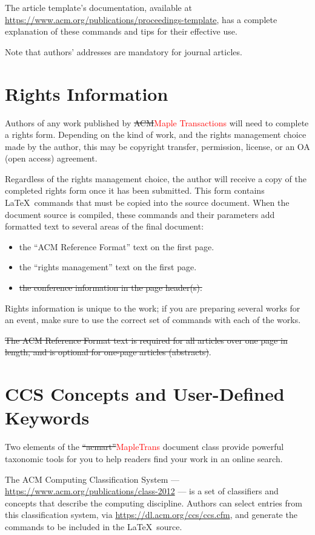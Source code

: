 \documentclass[anonymous,review,acmsmall,screen]{MapleTrans}
\newcommand{\strikethrough}[1]{\sout{#1}}
\begin{document}
The article template's documentation, available at
\url{https://www.acm.org/publications/proceedings-template}, has a
complete explanation of these commands and tips for their effective
use.

Note that authors' addresses are mandatory for journal articles.

\section{Rights Information}

Authors of any work published by \strikethrough{ACM}\textcolor{red}{Maple Transactions} will need to complete a rights
form. Depending on the kind of work, and the rights management choice
made by the author, this may be copyright transfer, permission,
license, or an OA (open access) agreement.

Regardless of the rights management choice, the author will receive a
copy of the completed rights form once it has been submitted. This
form contains \LaTeX\ commands that must be copied into the source
document. When the document source is compiled, these commands and
their parameters add formatted text to several areas of the final
document:
\begin{itemize}
\item the ``ACM Reference Format'' text on the first page.
\item the ``rights management'' text on the first page.
\item \strikethrough{the conference information in the page header(s).}
\end{itemize}

Rights information is unique to the work; if you are preparing several
works for an event, make sure to use the correct set of commands with
each of the works.

\strikethrough{The ACM Reference Format text is required for all articles over one
page in length, and is optional for one-page articles (abstracts)}.

\section{CCS Concepts and User-Defined Keywords}

Two elements of the \strikethrough{``acmart''}\textcolor{red}{MapleTrans} document class provide powerful
taxonomic tools for you to help readers find your work in an online
search.

The ACM Computing Classification System ---
\url{https://www.acm.org/publications/class-2012} --- is a set of
classifiers and concepts that describe the computing
discipline. Authors can select entries from this classification
system, via \url{https://dl.acm.org/ccs/ccs.cfm}, and generate the
commands to be included in the \LaTeX\ source.
\end{document}
